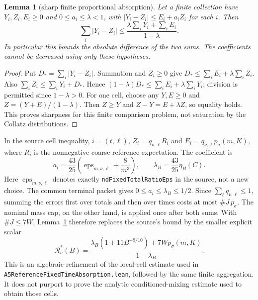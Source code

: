 \documentclass[11pt]{article}
\newtheorem{lemma}[proposition]{Lemma}
\theoremstyle{remark}\newtheorem{remark}[proposition]{Remark}
\begin{document}
\begin{lemma}[sharp finite proportional absorption]
\label{lem:mazur-sharp-absorption}
Let a finite collection have $Y_i,Z_i,E_i\ge0$ and
$0\le a_i\le\lambda<1$, with
$|Y_i-Z_i|\le E_i+a_iZ_i$ for each $i$. Then
\[
 \sum_i|Y_i-Z_i|
 \le\frac{\lambda\sum_iY_i+\sum_iE_i}{1-\lambda}.
 \label{eq:mazur-sharp-absorption}
\]
In particular this bounds the absolute difference of the two sums.
The coefficients cannot be decreased using only these hypotheses.
\end{lemma}
\begin{proof}
Put $D_*=\sum_i|Y_i-Z_i|$. Summation and $Z_i\ge0$ give
$D_*\le\sum_iE_i+\lambda\sum_iZ_i$.
Also $\sum_iZ_i\le\sum_iY_i+D_*$.
Hence $(1-\lambda)D_*\le\sum_iE_i+\lambda\sum_iY_i$;
division is permitted since $1-\lambda>0$.
For one cell, choose any $Y,E\ge0$ and $Z=(Y+E)/(1-\lambda)$.
Then $Z\ge Y$ and $Z-Y=E+\lambda Z$, so equality holds.
This proves sharpness for this finite comparison problem, not
saturation by the Collatz distributions.
\end{proof}

In the source cell inequality,
$i=(t,\ell)$, $Z_i=q_{\nu,\ell}R_i$ and
$E_i=q_{\nu,\ell}p_\sigma(m,K)$, where $R_i$ is the nonnegative
coarse-reference expectation. The coefficient is
\[
 a_i=\frac{43}{25}
   \left(\operatorname{eps}_{m,\nu,\ell}+\frac8{m^3}\right),
 \qquad
 \lambda_B=\frac{43}{25}\eta_B(C).
\]
Here $\operatorname{eps}_{m,\nu,\ell}$ denotes exactly
\texttt{ndFixedTotalRatioEps} in the source, not a new choice.
The common terminal packet gives $0\le a_i\le\lambda_B\le1/2$.
Since $\sum_\ell q_{\nu,\ell}\le1$, summing the errors first over
totals and then over times costs at most $\#J\,p_\sigma$.
The nominal mass cap, on the other hand, is applied once after
both sums. With $\#J\le7W$, Lemma~\ref{lem:mazur-sharp-absorption}
therefore replaces the source's bound by the smaller explicit scalar
\[
 \mathcal R_\sigma^*(B)=
 \frac{\lambda_B(1+11B^{-9/10})+7W p_\sigma(m,K)}
      {1-\lambda_B}.
 \label{eq:mazur-sharp-terminal}
\]
This is an algebraic refinement of the local-cell estimate
used in \texttt{A5ReferenceFixedTimeAbsorption.lean}, followed
by the same finite aggregation. It does not purport to prove
the analytic conditioned-mixing estimate used to obtain those cells.
\end{document}
